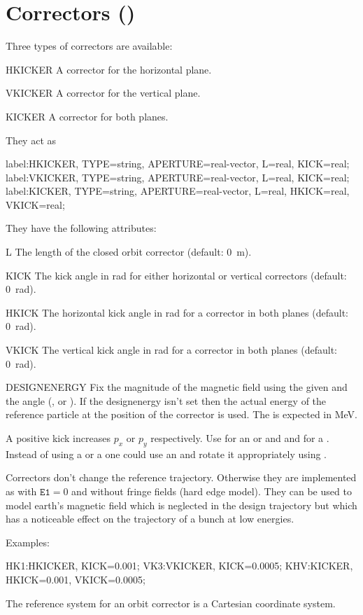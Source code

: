 \clearpage
\section{Correctors (\opalt)}
\label{sec:corrector}
Three types of correctors are available:
\begin{kdescription}
\item[HKICKER]
  \label{sec:hkicker}
  A corrector for the horizontal plane.
\item[VKICKER]
  \label{sec:vkicker}
  A corrector for the vertical plane.
\item[KICKER]
  \label{sec:kicker}
  A corrector for both planes.
\end{kdescription}
They act as
\begin{example}
label:HKICKER, TYPE=string, APERTURE=real-vector,
      L=real, KICK=real;
label:VKICKER, TYPE=string, APERTURE=real-vector,
      L=real, KICK=real;
label:KICKER, TYPE=string, APERTURE=real-vector,
      L=real, HKICK=real, VKICK=real;
\end{example}
They have the following attributes:
\begin{kdescription}
\item[L]
  The length of the closed orbit corrector (default: 0~m).
\item[KICK]
  The kick angle in \si{\radian} for either horizontal or vertical correctors
  (default: \SI{0}{\radian}).
\item[HKICK]
  The horizontal kick angle in \si{\radian} for a corrector in both planes
  (default: \SI{0}{\radian}).
\item[VKICK]
  The vertical kick angle in \si{\radian} for a corrector in both planes
  (default: \SI{0}{\radian}).
\item[DESIGNENERGY]
  Fix the magnitude of the magnetic field using the given  and the angle (,  or ). If the designenergy isn't set then the actual energy of the reference particle at the position of the corrector is used. The  is expected in \si{\mega\electronvolt}.
\end{kdescription}
A positive kick increases $p_{x}$ or $p_{y}$
respectively. Use  for an  or  and  and  for a . Instead of using a  or a  one could use an  and rotate it appropriately using .

Correctors don't change the reference trajectory. Otherwise they are implemented as  with $\texttt{E1} = 0$ and without fringe fields (hard edge model). They can be used to model earth's magnetic field which is neglected in the design trajectory but which has a noticeable effect on the trajectory of a bunch at low energies.

\noindent Examples:
\begin{example}
HK1:HKICKER, KICK=0.001;
VK3:VKICKER, KICK=0.0005;
KHV:KICKER, HKICK=0.001, VKICK=0.0005;
\end{example}
The reference system for an orbit corrector is a Cartesian coordinate system.

